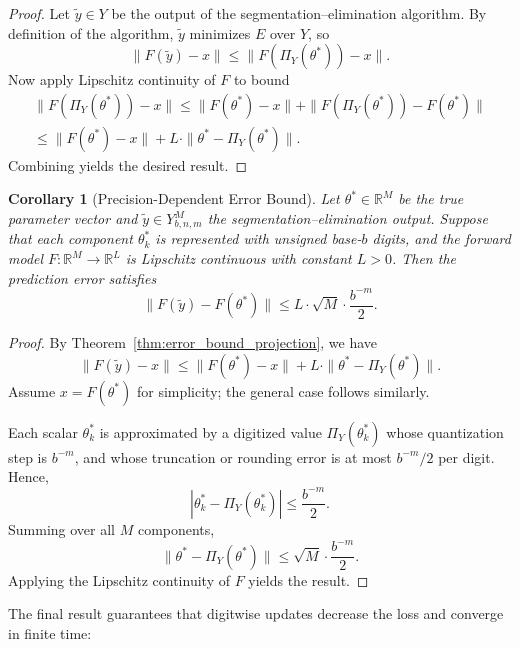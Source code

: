 \documentclass[aps,twocolumn,superscriptaddress,nofootinbib]{revtex4}
\newtheorem{corollary}{Corollary}
\begin{document}
\begin{proof}
Let \( \tilde{y} \in Y \) be the output of the segmentation--elimination algorithm. By definition of the algorithm, \( \tilde{y} \) minimizes \( E \) over \( Y \), so
\[
\|F(\tilde{y}) - x\| \leq \|F(\Pi_Y(\theta^*)) - x\|.
\]
Now apply Lipschitz continuity of \( F \) to bound
\begin{multline}
\|F(\Pi_Y(\theta^*)) - x\| \leq \|F(\theta^*) - x\| + \|F(\Pi_Y(\theta^*)) - F(\theta^*)\| \\
\leq \|F(\theta^*) - x\| + L \cdot \|\theta^* - \Pi_Y(\theta^*)\|.
\end{multline}
Combining yields the desired result.
\end{proof}

\begin{corollary}[Precision-Dependent Error Bound]
\label{cor:quantization_error}
Let \( \theta^* \in \mathbb{R}^M \) be the true parameter vector and \( \tilde{y} \in Y_{b,n,m}^M \) the segmentation--elimination output. Suppose that each component \( \theta^*_k \) is represented with unsigned base-\( b \) digits, and the forward model \( F : \mathbb{R}^M \to \mathbb{R}^L \) is Lipschitz continuous with constant \( L > 0 \). Then the prediction error satisfies
\[
\|F(\tilde{y}) - F(\theta^*)\| \leq L \cdot \sqrt{M} \cdot \frac{b^{-m}}{2}.
\]
\end{corollary}

\begin{proof}
By Theorem~\ref{thm:error_bound_projection}, we have
\[
\|F(\tilde{y}) - x\| \leq \|F(\theta^*) - x\| + L \cdot \|\theta^* - \Pi_Y(\theta^*)\|.
\]
Assume \( x = F(\theta^*) \) for simplicity; the general case follows similarly.

Each scalar \( \theta^*_k \) is approximated by a digitized value \( \Pi_Y(\theta^*_k) \) whose quantization step is \( b^{-m} \), and whose truncation or rounding error is at most \( b^{-m}/2 \) per digit. Hence,
\[
|\theta^*_k - \Pi_Y(\theta^*_k)| \leq \frac{b^{-m}}{2}.
\]
Summing over all \( M \) components,
\[
\|\theta^* - \Pi_Y(\theta^*)\| \leq \sqrt{M} \cdot \frac{b^{-m}}{2}.
\]
Applying the Lipschitz continuity of \( F \) yields the result.
\end{proof}

The final result guarantees that digitwise updates decrease the loss and converge in finite time:
\end{document}

